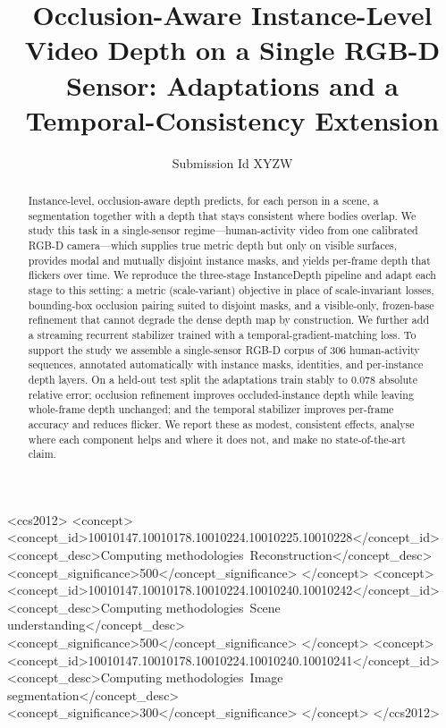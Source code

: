 \documentclass[sigconf, review=true]{acmart}
\begin{document}
\title{Occlusion-Aware Instance-Level Video Depth on a Single RGB-D Sensor:
       Adaptations and a Temporal-Consistency Extension}

\author{Submission Id XYZW}   %
\renewcommand{\shortauthors}{}

\begin{abstract}
Instance-level, occlusion-aware depth predicts, for each person in a scene, a
segmentation together with a depth that stays consistent where bodies overlap.
We study this task in a single-sensor regime---human-activity video from one
calibrated RGB-D camera---which supplies true metric depth but only on visible
surfaces, provides modal and mutually disjoint instance masks, and yields
per-frame depth that flickers over time. We reproduce the three-stage
InstanceDepth pipeline and adapt each stage to this setting: a metric
(scale-variant) objective in place of scale-invariant losses, bounding-box
occlusion pairing suited to disjoint masks, and a visible-only, frozen-base
refinement that cannot degrade the dense depth map by construction. We further
add a streaming recurrent stabilizer trained with a temporal-gradient-matching
loss. To support the study we assemble a single-sensor RGB-D corpus of $306$
human-activity sequences, annotated automatically with instance masks,
identities, and per-instance depth layers. On a held-out test split the
adaptations train stably to $0.078$ absolute relative error; occlusion
refinement improves occluded-instance depth while leaving whole-frame depth
unchanged; and the temporal stabilizer improves per-frame accuracy and reduces
flicker. We report these as modest, consistent effects, analyse where each
component helps and where it does not, and make no state-of-the-art claim.
\end{abstract}

\begin{CCSXML}
<ccs2012>
 <concept>
  <concept_id>10010147.10010178.10010224.10010225.10010228</concept_id>
  <concept_desc>Computing methodologies~Reconstruction</concept_desc>
  <concept_significance>500</concept_significance>
 </concept>
 <concept>
  <concept_id>10010147.10010178.10010224.10010240.10010242</concept_id>
  <concept_desc>Computing methodologies~Scene understanding</concept_desc>
  <concept_significance>500</concept_significance>
 </concept>
 <concept>
  <concept_id>10010147.10010178.10010224.10010240.10010241</concept_id>
  <concept_desc>Computing methodologies~Image segmentation</concept_desc>
  <concept_significance>300</concept_significance>
 </concept>
</ccs2012>
\end{CCSXML}
\end{document}
